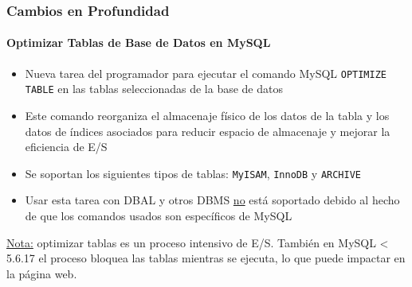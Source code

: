\begin{frame}[fragile]
	\frametitle{Cambios en Profundidad}
	\framesubtitle{Optimizar Tablas de Base de Datos en MySQL}

	\begin{itemize}

		\item Nueva tarea del programador para ejecutar el comando MySQL \texttt{OPTIMIZE TABLE}
			en las tablas seleccionadas de la base de datos

		\item Este comando reorganiza el almacenaje físico de los datos de la tabla y los datos de
			índices asociados para reducir espacio de almacenaje y mejorar la eficiencia de E/S

		\item Se soportan los siguientes tipos de tablas:\newline
			\texttt{MyISAM}, \texttt{InnoDB} y \texttt{ARCHIVE}

		\item Usar esta tarea con DBAL y otros DBMS \underline{no} está soportado
			debido al hecho de que los comandos usados son específicos de MySQL

	\end{itemize}


	\begingroup
		\color{red}
			\small
				\underline{Nota:} optimizar tablas es un proceso intensivo de E/S.
				También en MySQL < 5.6.17 el proceso bloquea las tablas mientras se ejecuta,
				lo que puede impactar en la página web.
			\normalsize
	\endgroup

\end{frame}


